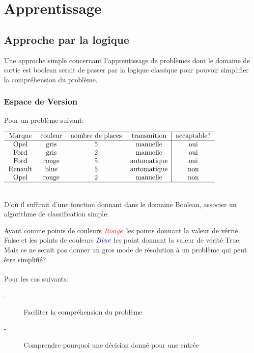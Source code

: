 \part{Apprentissage}
\pagebreak

\chapter{Approche par la logique}
Une approche simple concernant l'apprentissage de problèmes dont le domaine de sortie est boolean
serait de passer par la logique classique pour pouvoir simplifier la compréhension du problème.\\
\pagebreak
\section{Espace de Version}
Pour un problème suivant:

$\begin{tabular}{cccc|c}
\hline
Marque & couleur & nombre de places & transmition & accaptable? \\
\hline
Opel & gris & 5 & manuelle & oui\\
Ford & gris & 2 & manuelle & oui\\
Ford & rouge & 5 & automatique & oui\\
Renault & blue & 5 & automatique & non\\
Opel & rouge & 2 & manuelle & non\\
\hline
\end{tabular}$

\ \\
D'où il suffirait d'une fonction donnant dans le domaine Boolean, associer un algorithme de classification simple:


Ayant comme points de couleurs $\textcolor{red}{Rouge}$ les points donnant la valeur de vérité False et les points de couleurs $\textcolor{blue}{Blue}$ les point donnant la valeur de vérité True.\\
Mais ce ne serait pas donner un gros mode de résolution à un problème qui peut être simplifié?\\
\\
Pour les cas suivants:
\begin{description}
\item[-] Faciliter la compréhension du problème
\item[-] Comprendre pourquoi une décision donné pour une entrée
\end{description}
\pagebreak

